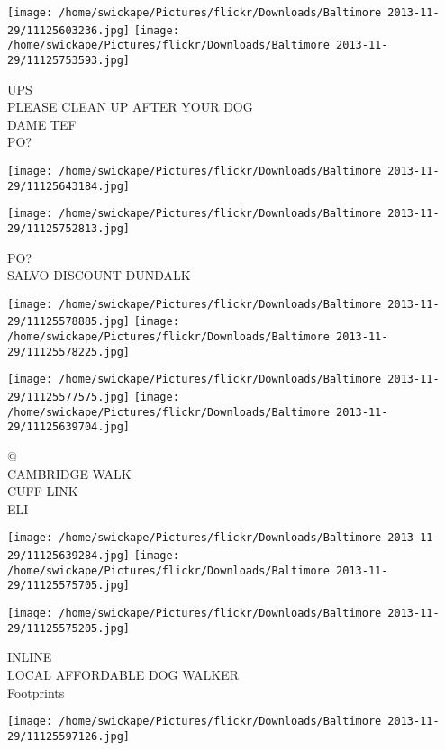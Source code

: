 \documentclass[10pt,letterpaper]{article}
\begin{document}
\texttt{[image: /home/swickape/Pictures/flickr/Downloads/Baltimore 2013-11-29/11125603236.jpg]}
\texttt{[image: /home/swickape/Pictures/flickr/Downloads/Baltimore 2013-11-29/11125753593.jpg]}

UPS\\
PLEASE CLEAN UP AFTER YOUR DOG\\
DAME TEF\\
PO?\\
\pagebreak

\texttt{[image: /home/swickape/Pictures/flickr/Downloads/Baltimore 2013-11-29/11125643184.jpg]}

\vspace{0.25in}
\texttt{[image: /home/swickape/Pictures/flickr/Downloads/Baltimore 2013-11-29/11125752813.jpg]}

PO?\\
SALVO DISCOUNT DUNDALK\\
\pagebreak

\texttt{[image: /home/swickape/Pictures/flickr/Downloads/Baltimore 2013-11-29/11125578885.jpg]}
\texttt{[image: /home/swickape/Pictures/flickr/Downloads/Baltimore 2013-11-29/11125578225.jpg]}

\texttt{[image: /home/swickape/Pictures/flickr/Downloads/Baltimore 2013-11-29/11125577575.jpg]}
\texttt{[image: /home/swickape/Pictures/flickr/Downloads/Baltimore 2013-11-29/11125639704.jpg]}

@\\
CAMBRIDGE WALK\\
CUFF LINK\\
ELI\\
\pagebreak

\texttt{[image: /home/swickape/Pictures/flickr/Downloads/Baltimore 2013-11-29/11125639284.jpg]}
\texttt{[image: /home/swickape/Pictures/flickr/Downloads/Baltimore 2013-11-29/11125575705.jpg]}

\texttt{[image: /home/swickape/Pictures/flickr/Downloads/Baltimore 2013-11-29/11125575205.jpg]}

INLINE\\
LOCAL AFFORDABLE DOG WALKER\\
Footprints\\
\pagebreak

\texttt{[image: /home/swickape/Pictures/flickr/Downloads/Baltimore 2013-11-29/11125597126.jpg]}
\end{document}
